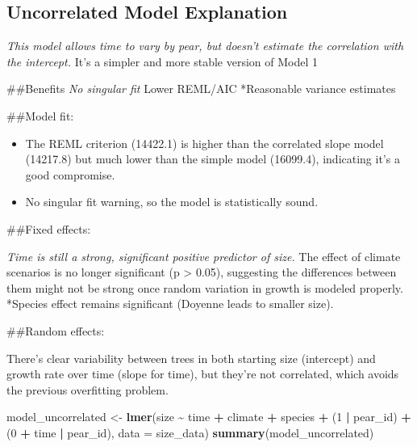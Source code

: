 \documentclass[
]{article}
\newenvironment{Shaded}{\begin{snugshade}}{\end{snugshade}}
\newcommand{\AttributeTok}[1]{\textcolor[rgb]{0.13,0.29,0.53}{#1}}
\newcommand{\DecValTok}[1]{\textcolor[rgb]{0.00,0.00,0.81}{#1}}
\newcommand{\FunctionTok}[1]{\textcolor[rgb]{0.13,0.29,0.53}{\textbf{#1}}}
\newcommand{\NormalTok}[1]{#1}
\newcommand{\OtherTok}[1]{\textcolor[rgb]{0.56,0.35,0.01}{#1}}
\newcommand{\SpecialCharTok}[1]{\textcolor[rgb]{0.81,0.36,0.00}{\textbf{#1}}}
\providecommand{\tightlist}{%
  \setlength{\itemsep}{0pt}\setlength{\parskip}{0pt}}
\begin{document}
\subsection{Uncorrelated Model
Explanation}\label{uncorrelated-model-explanation}

\emph{This model allows time to vary by pear, but doesn't estimate the
correlation with the intercept. }It's a simpler and more stable version
of Model 1

\#\#Benefits \emph{No singular fit }Lower REML/AIC *Reasonable variance
estimates

\#\#Model fit:

\begin{itemize}
\tightlist
\item
  The REML criterion (14422.1) is higher than the correlated slope model
  (14217.8) but much lower than the simple model (16099.4), indicating
  it's a good compromise.
\item
  No singular fit warning, so the model is statistically sound.
\end{itemize}

\#\#Fixed effects:

\emph{Time is still a strong, significant positive predictor of size.
}The effect of climate scenarios is no longer significant (p
\textgreater{} 0.05), suggesting the differences between them might not
be strong once random variation in growth is modeled properly. *Species
effect remains significant (Doyenne leads to smaller size).

\#\#Random effects:

There's clear variability between trees in both starting size
(intercept) and growth rate over time (slope for time), but they're not
correlated, which avoids the previous overfitting problem.

\begin{Shaded}
\begin{Highlighting}[]
\NormalTok{model\_uncorrelated }\OtherTok{\textless{}{-}} \FunctionTok{lmer}\NormalTok{(size }\SpecialCharTok{\textasciitilde{}}\NormalTok{ time }\SpecialCharTok{+}\NormalTok{ climate }\SpecialCharTok{+}\NormalTok{ species }\SpecialCharTok{+}\NormalTok{ (}\DecValTok{1} \SpecialCharTok{|}\NormalTok{ pear\_id) }\SpecialCharTok{+}\NormalTok{ (}\DecValTok{0} \SpecialCharTok{+}\NormalTok{ time }\SpecialCharTok{|}\NormalTok{ pear\_id), }\AttributeTok{data =}\NormalTok{ size\_data)}
\FunctionTok{summary}\NormalTok{(model\_uncorrelated)}
\end{Highlighting}
\end{Shaded}
\end{document}
